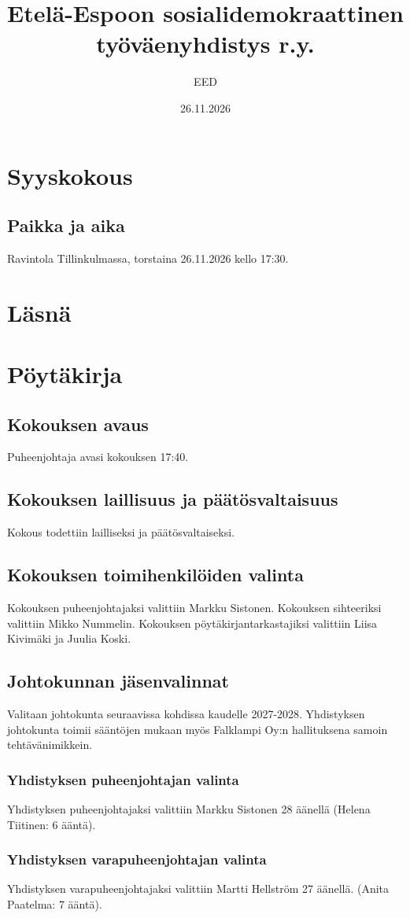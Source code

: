 \documentclass[a4paper,12pt]{article}
\title{Etelä-Espoon sosialidemokraattinen työväenyhdistys r.y.}
\author{EED}
\date{26.11.2026}
\begin{document}
\maketitle
\tableofcontents
\section*{Syyskokous}
\subsection*{Paikka ja aika}
Ravintola Tillinkulmassa, torstaina 26.11.2026 kello 17:30.
\section*{Läsnä}
\section*{Pöytäkirja}
\subsection{Kokouksen avaus}
Puheenjohtaja avasi kokouksen 17:40.
\subsection{Kokouksen laillisuus ja päätösvaltaisuus}
Kokous todettiin lailliseksi ja päätösvaltaiseksi.
\subsection{Kokouksen toimihenkilöiden valinta}
Kokouksen puheenjohtajaksi valittiin Markku Sistonen. Kokouksen sihteeriksi valittiin Mikko Nummelin. Kokouksen pöytäkirjantarkastajiksi valittiin Liisa Kivimäki ja Juulia Koski.
\subsection{Johtokunnan jäsenvalinnat}
Valitaan johtokunta seuraavissa kohdissa kaudelle 2027-2028. Yhdistyksen johtokunta toimii sääntöjen mukaan myös Falklampi Oy:n hallituksena samoin tehtävänimikkein.
\subsubsection{Yhdistyksen puheenjohtajan valinta}
Yhdistyksen puheenjohtajaksi valittiin Markku Sistonen 28 äänellä (Helena Tiitinen: 6 ääntä).
\subsubsection{Yhdistyksen varapuheenjohtajan valinta}
Yhdistyksen varapuheenjohtajaksi valittiin Martti Hellström 27 äänellä. (Anita Paatelma: 7 ääntä).
\end{document}
